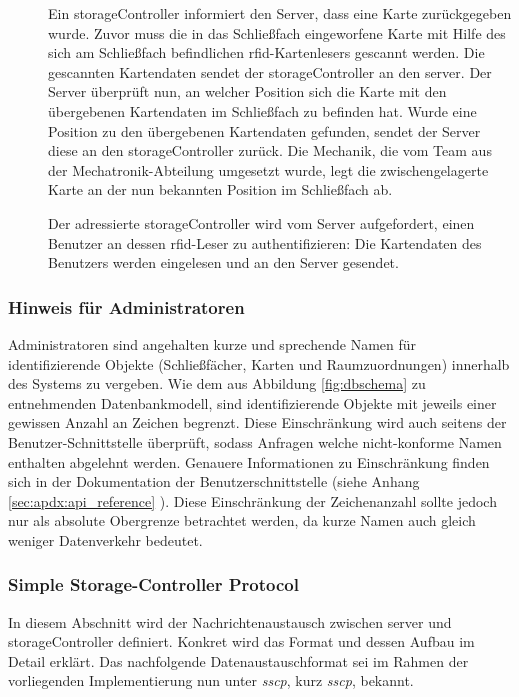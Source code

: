 \begin{description}
\item[] Ein \gls{storageController} informiert den Server, dass eine Karte zurückgegeben wurde. Zuvor muss die in das Schließfach eingeworfene Karte mit Hilfe des sich am Schließfach befindlichen \acrshort{rfid}-Kartenlesers gescannt werden. Die gescannten Kartendaten sendet der \gls{storageController} an den \gls{server}. Der Server überprüft nun, an welcher Position sich die Karte mit den übergebenen Kartendaten im Schließfach zu befinden hat. Wurde eine Position zu den übergebenen Kartendaten gefunden, sendet der Server diese an den \gls{storageController} zurück. Die Mechanik, die vom Team aus der Mechatronik-Abteilung umgesetzt wurde, legt die zwischengelagerte Karte an der nun bekannten Position im Schließfach ab.   
\item[] Der adressierte \gls{storageController} wird vom Server aufgefordert, einen Benutzer an dessen \acrshort{rfid}-Leser zu authentifizieren: Die Kartendaten des Benutzers werden eingelesen und an den Server gesendet.  
\end{description}

\subsubsection{Hinweis für Administratoren}\label{sec:impl:disclaimer-admin} 
Administratoren sind angehalten kurze und sprechende Namen für identifizierende Objekte (Schließfächer, Karten und Raumzuordnungen) innerhalb des Systems zu vergeben. Wie dem aus Abbildung \ref{fig:dbschema} zu entnehmenden Datenbankmodell, sind identifizierende Objekte mit jeweils einer gewissen Anzahl an Zeichen begrenzt. Diese Einschränkung wird auch seitens der Benutzer-Schnittstelle überprüft, sodass Anfragen welche nicht-konforme Namen enthalten abgelehnt werden. Genauere Informationen zu Einschränkung finden sich in der Dokumentation der Benutzerschnittstelle (siehe Anhang \ref{sec:apdx:api_reference} ). Diese Einschränkung der Zeichenanzahl sollte jedoch nur als absolute Obergrenze betrachtet werden, da kurze Namen auch gleich weniger Datenverkehr bedeutet.  

\subsubsection{Simple Storage-Controller Protocol}
In diesem Abschnitt wird der Nachrichtenaustausch zwischen \gls{server} und \gls{storageController} definiert. Konkret wird das Format und dessen Aufbau im Detail erklärt. Das nachfolgende Datenaustauschformat sei im Rahmen der vorliegenden Implementierung nun unter \textit{\acrlong{sscp}}, kurz \textit{\acrshort{sscp}}, bekannt.


